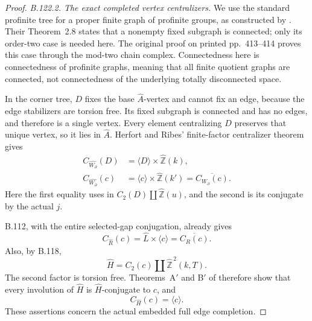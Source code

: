 \begin{proof}
\emph{B.122.2. The exact completed vertex centralizers.}
We use the standard profinite tree for a proper finite graph of
profinite groups, as constructed by
\citet[Proposition~3.8]{B_ZalesskiiMelnikov1989}. Their
Theorem~2.8 states that a nonempty fixed subgraph is connected;
only its order-two case is needed here. The original proof on
printed pp.~413--414 proves this case through the mod-two chain
complex. Connectedness here is connectedness of profinite graphs,
meaning that all finite quotient graphs are connected, not
connectedness of the underlying totally disconnected space.

In the corner tree, $D$ fixes the base $\widehat A$-vertex and
cannot fix an edge, because the edge stabilizers are torsion free.
Its fixed subgraph is connected and has no edges, and therefore
is a single vertex. Every element centralizing $D$ preserves that
unique vertex, so it lies in $\widehat A$. Herfort and Ribes'
finite-factor centralizer theorem gives
\begin{equation}\label{eq:B122-corner-centralizers}
 \begin{aligned}
 C_{\widehat{W_{\partial}}}(D)
   &=\langle D\rangle\times\widehat{\mathbb Z}(k),\\
 C_{\widehat{W_{\partial}}}(c)
   &=\langle c\rangle\times\widehat{\mathbb Z}(k')
     =\overline{C_{W_{\partial}}(c)}.
 \end{aligned}
\end{equation}
Here the first equality uses
\citet[Theorem~B$'$]{A_HR1985} in
$C_2(D)\amalg\widehat{\mathbb Z}(u)$, and the second is its
conjugate by the actual $j$.

B.112, with the entire selected-gap conjugation, already gives
\begin{equation}\label{eq:B122-regional-centralizer}
 C_{\widehat R}(c)=\widehat L\times\langle c\rangle
                 =\overline{C_R(c)}.
\end{equation}
Also, by B.118,
\[
 \widehat H=C_2(c)\amalg\widehat{\mathbb Z}^{\,2}(k,T).
\]
The second factor is torsion free. Theorems~A$'$ and B$'$ of
\citet{A_HR1985} therefore show that every involution of
$\widehat H$ is $\widehat H$-conjugate to $c$, and
\begin{equation}\label{eq:B122-edge-centralizer}
 C_{\widehat H}(c)=\langle c\rangle.
\end{equation}
These assertions concern the actual embedded full edge completion.


\end{proof}
